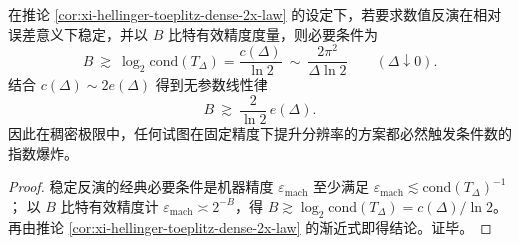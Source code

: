 \begin{corollary}\label{cor:xi-hellinger-toeplitz-bit-budget-linear-law}
在推论 \ref{cor:xi-hellinger-toeplitz-dense-2x-law} 的设定下，若要求数值反演在相对误差意义下稳定，并以 \(B\) 比特有效精度度量，则必要条件为
\[
\boxed{\;
B\ \gtrsim\ \log_2\mathrm{cond}(T_\Delta)=\frac{c(\Delta)}{\ln 2}
\ \sim\ \frac{2\pi^{2}}{\Delta\ln 2}\qquad(\Delta\downarrow0).\;}
\]
结合 \(c(\Delta)\sim 2e(\Delta)\) 得到无参数线性律
\[
B\ \gtrsim\ \frac{2}{\ln 2}\,e(\Delta).
\]
因此在稠密极限中，任何试图在固定精度下提升分辨率的方案都必然触发条件数的指数爆炸。
\end{corollary}
\begin{proof}
稳定反演的经典必要条件是机器精度 \(\varepsilon_{\mathrm{mach}}\) 至少满足 \(\varepsilon_{\mathrm{mach}}\lesssim \mathrm{cond}(T_\Delta)^{-1}\)；
以 \(B\) 比特有效精度计 \(\varepsilon_{\mathrm{mach}}\asymp 2^{-B}\)，得 \(B\gtrsim \log_2\mathrm{cond}(T_\Delta)=c(\Delta)/\ln 2\)。
再由推论 \ref{cor:xi-hellinger-toeplitz-dense-2x-law} 的渐近式即得结论。证毕。
\end{proof}
